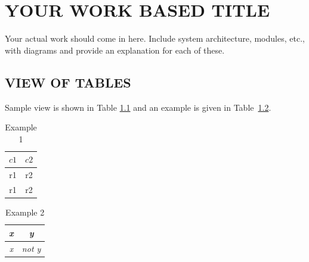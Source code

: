 
\chapter{\uppercase{Your work based title}} %
\label{ch:chap3} %
Your actual work should come in here. Include system architecture, modules, etc., with diagrams and provide an explanation for each of these. 
\section{\uppercase{View of Tables}}
Sample view  is shown in Table \ref{tab:first} and an example is given in Table~\ref{tab:second}.
\begin{table}[h]
\caption{Example 1}
\begin{center}
\begin{tabular}{|c|c|}
\hline
$c1$ & $c2$ \\
\hline
r1 & r2 \\
\hline
r1  & r2 \\
\hline
\end{tabular}
\end{center}
\label{tab:first}
\end{table}
\begin{table}[h]
\caption{Example 2}
\begin{center}
\begin{tabular}{|c|c|}
\hline
\textit{x} & \textit{y}  \\
\hline
\textit{x} & \textit{not y}  \\
\hline
\end{tabular}
\end{center}
\label{tab:second}
\end{table}

